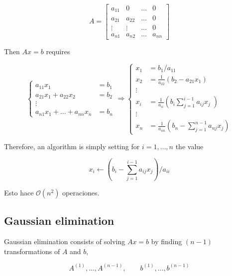 \documentclass[12pt]{article}
\theoremstyle{definition}
\begin{document}
\begin{equation*}
    A = \begin{bmatrix} 
        a_{11}  & 0 & \ldots & 0 \\ 
        a_{21} & a_{22} & \ldots & 0 \\ 
        \vdots & \vdots & \ldots & 0 \\ 
        a_{n1} & a_{n2} & \ldots & a_{nn}
    \end{bmatrix} 
\end{equation*}

Then $Ax = b$ requires 

\begin{equation*}
    \begin{cases}
        a_{11}x_1 &= b_1 \\ 
        a_{21} x_1 + a_{22} x_2 &= b_2 \\ 
        \vdots \\ 
        a_{n1}x_1 + \ldots + a_{nn}x_n &= b_n
    \end{cases} \Rightarrow 
    \begin{cases}
        x_1 &= b_1 / a_{11} \\ 
        x_2 &= \frac{1}{a_{22}} (b_2 - a_{21}x_1  ) \\ 
        \vdots \\ 
        x_i &= \frac{1}{a_{ii}} \left(b_i \sum_{j=1}^{i-1} a_{ij}x_j\left) \\ 
        \vdots \\ 
        x_n &= \frac{1}{a_{nn}} \left( b_n - \sum_{j=1}^{n-1} a_{nj} x_j \right) 
    \end{cases}
\end{equation*}

Therefore, an algorithm is simply setting for $i = 1, \ldots, n$ the value 

\begin{equation*}
    x_i \leftarrow \left( b_i - \sum_{j=1}^{i-1} a_{ij} x_j \right) / a_{ii}
\end{equation*}

Esto hace $\mathcal{O}(n^2)$ operaciones.

\subsection{Gaussian elimination}

Gaussian elimination consists of solving $Ax = b$ by finding $(n-1)$
transformations of $A$ and $b$, 

\begin{equation*}
    A^{(1)}, \ldots, A^{(n-1)}, \qquad b^{(1)}, \ldots, b^{(n-1)}
\end{equation*}
\end{document}
